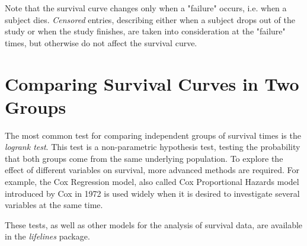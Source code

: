Note that the survival curve changes only when a "failure" occurs, i.e. when a subject dies. \emph{Censored} entries, describing either when a subject drops out of the study or when the study finishes, are taken into consideration at the "failure" times, but otherwise do not affect the survival curve.

\section{Comparing Survival Curves in Two Groups} 

The most common test for comparing independent groups of survival times is the \emph{logrank test}. This test is a non-parametric hypothesis test, testing the probability that both groups come from the same underlying population. To explore the effect of different variables on survival, more advanced methods are required. For example, the Cox Regression model, also called Cox Proportional Hazards model introduced by Cox in 1972 is used widely when it is desired to investigate several variables at the same time.

These tests, as well as other models for the analysis of survival data, are available in the \emph{lifelines} package.
